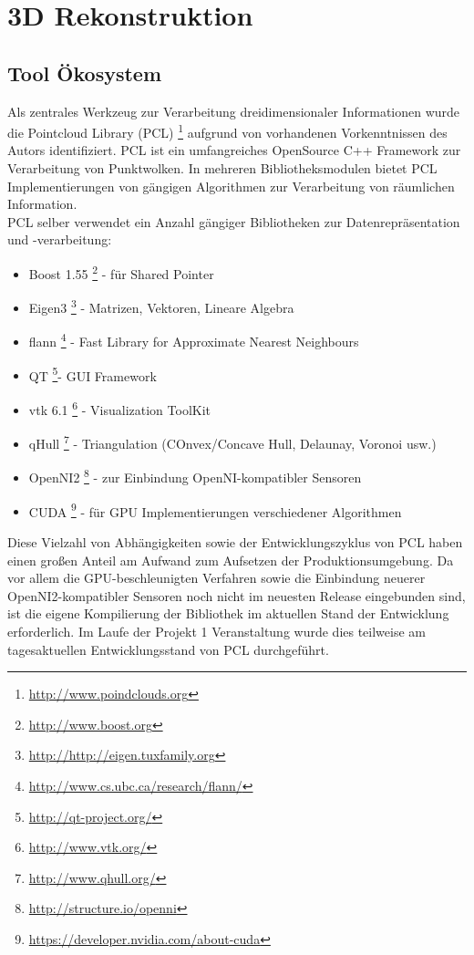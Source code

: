 \section{3D Rekonstruktion}
\subsection{Tool Ökosystem}
Als zentrales Werkzeug zur Verarbeitung dreidimensionaler Informationen wurde die Pointcloud Library (PCL) \footnote{\url{http://www.poindclouds.org}} aufgrund von vorhandenen Vorkenntnissen des Autors identifiziert. PCL ist ein umfangreiches OpenSource C++ Framework zur Verarbeitung von Punktwolken. In mehreren Bibliotheksmodulen bietet PCL Implementierungen von gängigen Algorithmen zur Verarbeitung von räumlichen Information.\\
PCL selber verwendet ein Anzahl gängiger Bibliotheken zur Datenrepräsentation und -verarbeitung:

\begin{itemize}
		\item Boost 1.55 \footnote{\url{http://www.boost.org}} - für Shared Pointer
		\item Eigen3 \footnote{\url{http://http://eigen.tuxfamily.org}} - Matrizen, Vektoren, Lineare Algebra
		\item flann \footnote{\url{http://www.cs.ubc.ca/research/flann/}} - Fast Library for Approximate Nearest Neighbours
		\item QT \footnote{\url{http://qt-project.org/}}- GUI Framework
		\item vtk 6.1 \footnote{\url{http://www.vtk.org/}} - Visualization ToolKit
		\item qHull \footnote{\url{http://www.qhull.org/}} - Triangulation (COnvex/Concave Hull, Delaunay, Voronoi usw.)
		\item OpenNI2 \footnote{\url{http://structure.io/openni}} - zur Einbindung OpenNI-kompatibler Sensoren
		\item CUDA \footnote{\url{https://developer.nvidia.com/about-cuda}} - für GPU Implementierungen verschiedener Algorithmen
\end{itemize}

Diese Vielzahl von Abhängigkeiten sowie der Entwicklungszyklus von PCL haben einen großen Anteil am Aufwand zum Aufsetzen der Produktionsumgebung. Da vor allem die GPU-beschleunigten Verfahren sowie die Einbindung neuerer OpenNI2-kompatibler Sensoren noch nicht im neuesten Release eingebunden sind, ist die eigene Kompilierung der Bibliothek im aktuellen Stand der Entwicklung erforderlich. Im Laufe der Projekt 1 Veranstaltung wurde dies teilweise am tagesaktuellen Entwicklungsstand von PCL durchgeführt.\\

